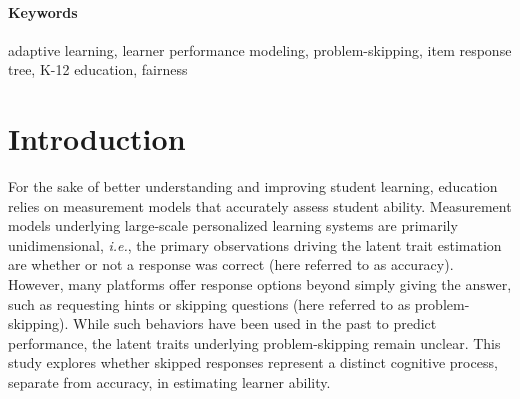 \documentclass[11pt]{article}
\begin{document}
\begin{abstract}
Student learning behavior reflects not only cognitive ability, but also metacognitive regulation---how learners monitor and manage their own learning. This is particularly relevant in adaptive educational technology platforms, which often allow for different types of non-responding, such as skipping a problem. Commonly, these options are an intentional design choice to sustain engagement. While such features can be beneficial for motivation, the non-response patterns it induces may also introduce metacognitive dynamics that threaten the assumption of unidimensionality underlying educational measurement models. This has consequences for the accuracy and fairness of ability estimates, and these risks may be amplified by the continuous updating of estimates that underpin adaptive systems. In this study, we apply a tree-based item response model to disentangle cognitive ability from non-responding behavior, using data from over \num{3500} learners from a large-scale K-12 adaptive learning platform. We find that ability and non-responding are moderately correlated, but distinguishable latent traits, confirming that non-responding should not be ignored when estimating learner ability. These results highlight a core tension in adaptive educational technology design: powerful unidimensional models offer practical efficiency, but more complex models may be needed to capture individual differences in metacognitive processes. We discuss implications for both measurement practice and platform design, and propose several ways to navigate this trade-off. 
 
\end{abstract}

\paragraph{Keywords}
adaptive learning, learner performance modeling, problem-skipping, item response tree, K-12 education, fairness
\newpage 

\section{Introduction}
For the sake of better understanding and improving student learning, education relies on measurement models that accurately assess student ability. Measurement models underlying large-scale personalized learning systems are primarily unidimensional, \textit{i.e.}, the primary observations driving the latent trait estimation are whether or not a response was correct (here referred to as accuracy). However, many platforms offer response options beyond simply giving the answer, such as requesting hints or skipping questions (here referred to as problem-skipping). While such behaviors have been used in the past to predict performance, the latent traits underlying problem-skipping remain unclear. This study explores whether skipped responses represent a distinct cognitive process, separate from accuracy, in estimating learner ability. 
\end{document}
